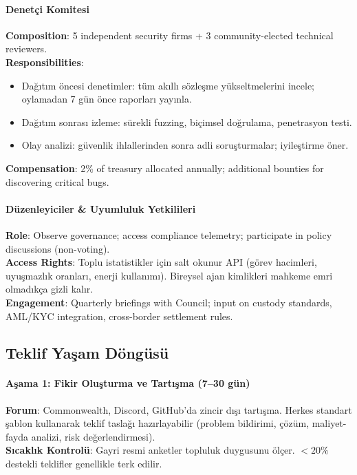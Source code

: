 \documentclass[11pt]{article}
\begin{document}
\begin{itemize}[noitemsep]
\begin{itemize}[noitemsep]
\begin{itemize}[noitemsep]
\begin{itemize}[noitemsep]
\begin{itemize}[noitemsep]
\begin{itemize}[noitemsep]
\begin{itemize}[noitemsep]
\begin{enumerate}[noitemsep]
\begin{itemize}[noitemsep]
\paragraph{Denetçi Komitesi}
\textbf{Composition}: 5 independent security firms + 3 community-elected technical reviewers.\\
\textbf{Responsibilities}:
\begin{itemize}[noitemsep]
  \item Dağıtım öncesi denetimler: tüm akıllı sözleşme yükseltmelerini incele; oylamadan 7 gün önce raporları yayınla.
  \item Dağıtım sonrası izleme: sürekli fuzzing, biçimsel doğrulama, penetrasyon testi.
  \item Olay analizi: güvenlik ihlallerinden sonra adli soruşturmalar; iyileştirme öner.
\end{itemize}
\textbf{Compensation}: 2\% of treasury allocated annually; additional bounties for discovering critical bugs.

\paragraph{Düzenleyiciler \& Uyumluluk Yetkilileri}
\textbf{Role}: Observe governance; access compliance telemetry; participate in policy discussions (non-voting).\\
\textbf{Access Rights}: Toplu istatistikler için salt okunur API (görev hacimleri, uyuşmazlık oranları, enerji kullanımı). Bireysel ajan kimlikleri mahkeme emri olmadıkça gizli kalır.\\
\textbf{Engagement}: Quarterly briefings with Council; input on custody standards, AML/KYC integration, cross-border settlement rules.

\subsection{Teklif Yaşam Döngüsü}

\paragraph{Aşama 1: Fikir Oluşturma ve Tartışma (7--30 gün)}
\textbf{Forum}: Commonwealth, Discord, GitHub'da zincir dışı tartışma. Herkes standart şablon kullanarak teklif taslağı hazırlayabilir (problem bildirimi, çözüm, maliyet-fayda analizi, risk değerlendirmesi).\\
\textbf{Sıcaklık Kontrolü}: Gayri resmi anketler topluluk duygusunu ölçer. $<20\%$ destekli teklifler genellikle terk edilir.


\end{itemize}
\end{enumerate}
\end{itemize}
\end{itemize}
\end{itemize}
\end{itemize}
\end{itemize}
\end{itemize}
\end{itemize}
\end{document}

